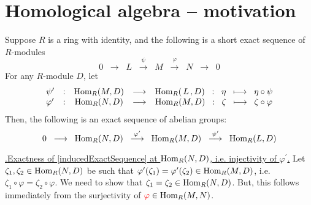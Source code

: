 

\section{Homological algebra -- motivation}
\setcounter{theorem}{0}
\setcounter{equation}{0}


\renewcommand{\theenumi}{\roman{enumi}}
\renewcommand{\labelenumi}{\textnormal{(\theenumi)}$\;\;$}


\begin{proposition}
\label{homologicalAlgebraMotivation}
\mbox{}
\vskip 0.1cm
\noindent
Suppose $R$ is a ring with identity, and the following is
a short exact sequence of $R$-modules
\begin{equation}\label{givenShortExactSequence}
0
\;\; \longrightarrow \;\;
	L
\;\; \overset{\psi}{\longrightarrow} \;\;
	M
\;\; \overset{\varphi}{\longrightarrow} \;\;
	N
\;\; \longrightarrow \;\;
	0
\end{equation}
For any $R$-module $D$, let 
\begin{equation*}
\begin{array}{lccccc}
\psi^{\prime} & : & \textnormal{Hom}_{R}(M,D) & \longrightarrow & \textnormal{Hom}_{R}(\,L\,,D) \;\; : \;\; \eta \;\; \longmapsto \;\; \eta \circ \psi
\\
\varphi^{\prime} & : & \textnormal{Hom}_{R}(N,D) & \longrightarrow & \textnormal{Hom}_{R}(M,D) \;\; : \;\; \zeta \;\; \longmapsto \;\; \zeta \circ \varphi
\end{array}
\end{equation*}
Then, the following is an exact sequence of abelian groups:
\begin{equation}\label{inducedExactSequence}
0
\;\; \longrightarrow \;\;
	\textnormal{Hom}_{R}(N,D)
\;\; \overset{\varphi^{\prime}}{\longrightarrow} \;\;
	\textnormal{Hom}_{R}(M,D)
\;\; \overset{\psi^{\prime}}{\longrightarrow} \;\;
	\textnormal{Hom}_{R}(L,D)
\end{equation}
\end{proposition}
\proof

\vskip 0.25cm
\noindent
\underline{{\color{white}.}Exactness of \eqref{inducedExactSequence} at $\textnormal{Hom}_{R}(N,D)$, i.e. {\color{red}injectivity of $\varphi^{\prime}$}{\color{white}.}}
\vskip 0.25cm
\noindent
Let $\zeta_{1}, \zeta_{2} \in \textnormal{Hom}_{R}(N,D)$ be such that
$\varphi^{\prime}(\zeta_{1}) = \varphi^{\prime}(\zeta_{2}) \in \textnormal{Hom}_{R}(M,D)$, i.e.
$\zeta_{1} \circ \varphi = \zeta_{2} \circ \varphi$.
We need to show that $\zeta_{1} = \zeta_{2} \in \textnormal{Hom}_{R}(N,D)$.
But, this follows immediately from the {\color{red}surjectivity of} ${\color{red}\varphi} \in \textnormal{Hom}_{R}(M,N)$.


